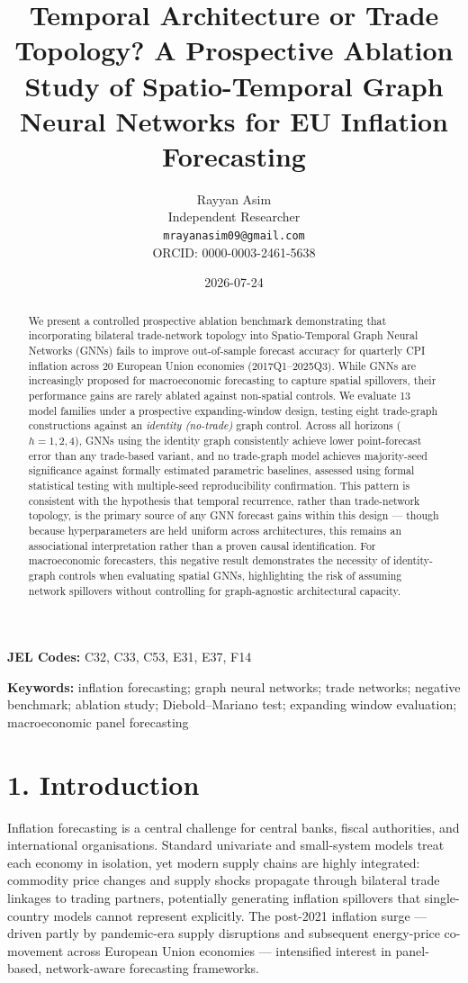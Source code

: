 \documentclass[
]{article}
\title{Temporal Architecture or Trade Topology? A Prospective Ablation Study of Spatio-Temporal Graph Neural Networks for EU Inflation Forecasting}
\author{Rayyan Asim \\ Independent Researcher \\ \texttt{mrayanasim09@gmail.com} \\ ORCID: 0000-0003-2461-5638}
\date{2026-07-24}
\begin{document}
\maketitle
\begin{abstract}
We present a controlled prospective ablation benchmark demonstrating that incorporating bilateral trade-network topology into Spatio-Temporal Graph Neural Networks (GNNs) fails to improve out-of-sample forecast accuracy for quarterly CPI inflation across 20 European Union economies (2017Q1--2025Q3). While GNNs are increasingly proposed for macroeconomic forecasting to capture spatial spillovers, their performance gains are rarely ablated against non-spatial controls. We evaluate 13 model families under a prospective expanding-window design, testing eight trade-graph constructions against an \emph{identity (no-trade)} graph control. Across all horizons ($h=1,2,4$), GNNs using the identity graph consistently achieve lower point-forecast error than any trade-based variant, and no trade-graph model achieves majority-seed significance against formally estimated parametric baselines, assessed using formal statistical testing with multiple-seed reproducibility confirmation. This pattern is consistent with the hypothesis that temporal recurrence, rather than trade-network topology, is the primary source of any GNN forecast gains within this design --- though because hyperparameters are held uniform across architectures, this remains an associational interpretation rather than a proven causal identification. For macroeconomic forecasters, this negative result demonstrates the necessity of identity-graph controls when evaluating spatial GNNs, highlighting the risk of assuming network spillovers without controlling for graph-agnostic architectural capacity.
\end{abstract}

\noindent\textbf{JEL Codes:} C32, C33, C53, E31, E37, F14

\noindent\textbf{Keywords:} inflation forecasting; graph neural networks; trade networks; negative benchmark; ablation study; Diebold--Mariano test; expanding window evaluation; macroeconomic panel forecasting

\section{1. Introduction}\label{introduction}

Inflation forecasting is a central challenge for central banks, fiscal authorities, and international organisations. Standard univariate and small-system models treat each economy in isolation, yet modern supply chains are highly integrated: commodity price changes and supply shocks propagate through bilateral trade linkages to trading partners, potentially generating inflation spillovers that single-country models cannot represent explicitly. The post-2021 inflation surge — driven partly by pandemic-era supply disruptions and subsequent energy-price co-movement across European Union economies — intensified interest in panel-based, network-aware forecasting frameworks.
\end{document}
